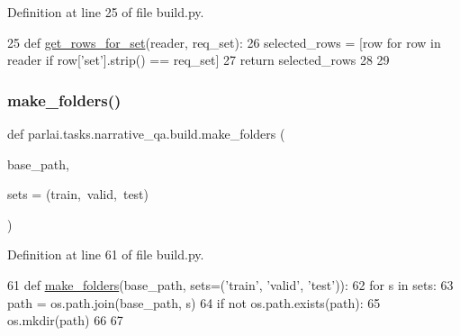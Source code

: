 Definition at line 25 of file build.\+py.


\begin{DoxyCode}
25 \textcolor{keyword}{def }\hyperlink{namespaceparlai_1_1tasks_1_1narrative__qa_1_1build_a8d4e1f30e3de3f62c039296cbed12e8d}{get\_rows\_for\_set}(reader, req\_set):
26     selected\_rows = [row \textcolor{keywordflow}{for} row \textcolor{keywordflow}{in} reader \textcolor{keywordflow}{if} row[\textcolor{stringliteral}{'set'}].strip() == req\_set]
27     \textcolor{keywordflow}{return} selected\_rows
28 
29 
\end{DoxyCode}
\mbox{\label{namespaceparlai_1_1tasks_1_1narrative__qa_1_1build_a602f90b82e6c6eafbd13647ba7567101}} 
\subsubsection{\texorpdfstring{make\+\_\+folders()}{make\_folders()}}
{\footnotesize\ttfamily def parlai.\+tasks.\+narrative\+\_\+qa.\+build.\+make\+\_\+folders (\begin{DoxyParamCaption}\item[{}]{base\+\_\+path,  }\item[{}]{sets = {\ttfamily (\textquotesingle{}train\textquotesingle{},~\textquotesingle{}valid\textquotesingle{},~\textquotesingle{}test\textquotesingle{})} }\end{DoxyParamCaption})}



Definition at line 61 of file build.\+py.


\begin{DoxyCode}
61 \textcolor{keyword}{def }\hyperlink{namespaceparlai_1_1tasks_1_1narrative__qa_1_1build_a602f90b82e6c6eafbd13647ba7567101}{make\_folders}(base\_path, sets=(\textcolor{stringliteral}{'train'}, \textcolor{stringliteral}{'valid'}, \textcolor{stringliteral}{'test'})):
62     \textcolor{keywordflow}{for} s \textcolor{keywordflow}{in} sets:
63         path = os.path.join(base\_path, s)
64         \textcolor{keywordflow}{if} \textcolor{keywordflow}{not} os.path.exists(path):
65             os.mkdir(path)
66 
67 
\end{DoxyCode}
\mbox{\label{namespaceparlai_1_1tasks_1_1narrative__qa_1_1build_a53e5ef8d085ebdfc1cc6c4918841d097}} 

